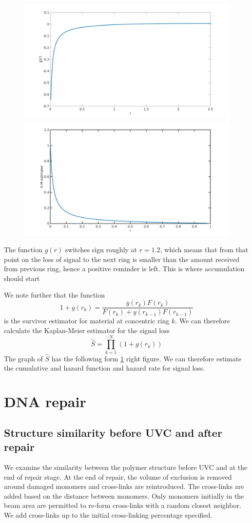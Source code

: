 \documentclass[12pt]{report}
\begin{document}
\begin{figure}[H]
\includegraphics[width=0.5\linewidth, height=0.3\textheight]{Images/patchExpansion/instantaneousLossGainFunction}
\includegraphics[width=0.5\linewidth, height=0.3\textheight]{Images/patchExpansion/KMEstimatorForSignalLoss}
\caption{}
\label{fig:instantaneousLossGainFunction}
\end{figure}
The function $g(r)$ switches sign roughly at $r=1.2$, which means that from that point on the loss of signal to the next ring is smaller than the amount received from previous ring, hence a positive reminder is left. This is where accumulation should start

We note further that the function 
\begin{equation*}
1+g(r_k)= \frac{y(r_k)F(r_k)}{F(r_k)+y(r_{k-1})F(r_{k-1})}
\end{equation*}
is the survivor estimator for material at concentric ring $k$. We can therefore calculate the Kaplan-Meier estimator for the signal loss 
\begin{equation*}
\hat{S} = \prod_{k=1}^{N}(1+g(r_k))
\end{equation*}
The graph of $\hat{S}$ has the following form \ref{fig:instantaneousLossGainFunction} right figure. We can therefore estimate the cumulative and hazard function and hazard rate for signal loss. 




 
\section{DNA repair}
	\subsection{Structure similarity before UVC and after repair}
	We examine the similarity between the polymer structure before UVC and at the end of repair stage. At the end of repair, the volume of exclusion is removed around damaged monomers and cross-links are reintroduced. The cross-links are added based on the distance between monomers. Only monomers initially in the beam area are permitted to re-form cross-links with a random closest neighbor. We add cross-links up to the initial cross-linking percentage specified. 
	
	
\end{document}
